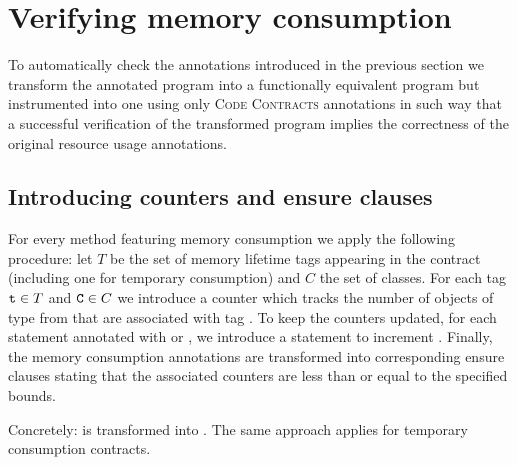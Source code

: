 \section{Verifying memory consumption} \label{sec:verification}
%
To automatically check the annotations introduced in the previous section we transform the annotated program into a functionally equivalent program but instrumented into one using only \textsc{Code Contracts} annotations in such way  that a successful  verification of the transformed program implies the correctness of the original resource usage annotations.

\subsection{Introducing counters and ensure clauses}
For every method  featuring memory consumption we apply the following procedure:
let $T$ be the set of memory lifetime tags appearing in the contract (including one for temporary consumption) and $C$ the set of classes. For each tag $\texttt{t} \in T$ and $\texttt{C} \in C$ we introduce a counter    which tracks the number of objects  of type   from   that are associated with tag .
To keep the counters updated, for each   statement annotated with  or , we introduce a statement to increment  . 
Finally, the memory consumption annotations are transformed into corresponding ensure clauses stating that the associated counters are less than or equal to the specified bounds. 

Concretely:   is transformed into . The same approach applies for  temporary consumption contracts.

